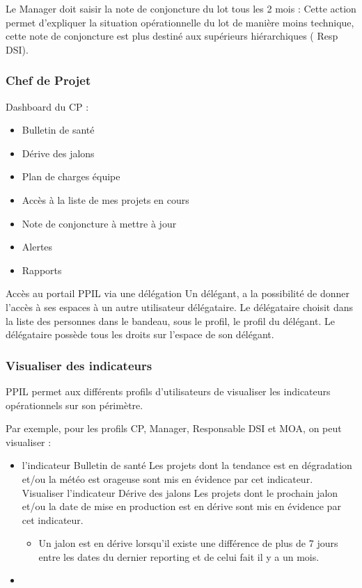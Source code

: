 Le Manager doit saisir la note de conjoncture du lot tous les 2 mois : 
Cette action permet d'expliquer la situation opérationnelle du lot de manière moins technique, cette note de conjoncture est plus destiné aux supérieurs hiérarchiques ( Resp DSI).

\subsubsection{Chef de Projet}
Dashboard du CP :

\begin{itemize}
    \item Bulletin de santé
    \item Dérive des jalons
    \item Plan de charges équipe
    \item Accès à la liste de mes projets en cours
    \item Note de conjoncture à mettre à jour
    \item Alertes
    \item Rapports
\end{itemize}

Accès au portail PPIL via une délégation
Un délégant, a la possibilité de donner l’accès à ses espaces à un autre utilisateur délégataire.
Le délégataire choisit dans la liste des personnes dans le bandeau, sous le profil, le profil du délégant. Le délégataire possède tous les droits sur l’espace de son délégant.

\subsubsection{Visualiser des indicateurs}

PPIL permet aux différents profils d'utilisateurs de visualiser les indicateurs opérationnels sur son périmètre.

Par exemple, pour les profils CP, Manager, Responsable DSI et MOA, on peut visualiser :

\begin{itemize}
    \item l’indicateur Bulletin de santé
Les projets dont la tendance est en dégradation et/ou la météo est orageuse sont mis en évidence par cet indicateur.
Visualiser l’indicateur Dérive des jalons
Les projets dont le prochain jalon et/ou la date de mise en production est en dérive sont mis en évidence par cet indicateur.
    \begin{itemize}
        \item Un jalon est en dérive lorsqu’il existe une différence de plus de 7 jours entre les dates du dernier reporting et de celui fait il y a un mois.
    \end{itemize}
    \item 
\end{itemize}

